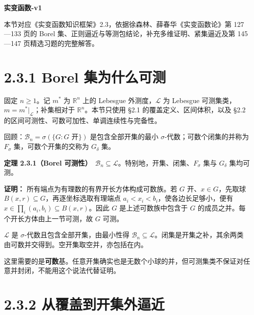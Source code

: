 \documentclass[11pt,a4paper]{article}
\begin{document}
\begin{center}
{\Large\bfseries 实变函数-v1\par}
\vspace{7pt}{\large 2.3 可测集的结构\par}
\vspace{5pt}{第二章 Lebesgue 测度\par}
\end{center}
本节对应《实变函数知识框架》2.3，依据徐森林、薛春华《实变函数论》第 127—133 页的 Borel 集、正则逼近与等测包结论，补充多维证明、紧集逼近及第 145—147 页精选习题的完整解答。
\begingroup\setlength{\parskip}{0pt}\tableofcontents\endgroup

\section[\S{}2.3.1 Borel
集为什么可测]{2.3.1 Borel
集为什么可测}\label{borel-ux96c6ux4e3aux4ec0ux4e48ux53efux6d4b}

固定 \(n\ge1\)。记 \(m^*\) 为 \(\mathbb R^n\) 上的 Lebesgue
外测度，\(\mathcal L\) 为 Lebesgue
可测集类，\(m=m^*|_{\mathcal L}\)；补集相对于
\(\mathbb R^n\)。本节只使用 §2.1 的覆盖定义、区间体积，以及 §2.2
的区间可测性、可数可加性、单调连续性与完备性。

回顾：\(\mathcal B_n=\sigma(\{G:G\text{ 开}\})\) 是包含全部开集的最小
\(\sigma\)-代数；可数个闭集的并称为 \(F_\sigma\) 集，可数个开集的交称为
\(G_\delta\) 集。

\textbf{定理 2.3.1（Borel
可测性）}　\(\mathcal B_n\subseteq\mathcal L\)。特别地，开集、闭集、\(F_\sigma\)
集与 \(G_\delta\) 集均可测。

\textbf{证明：} 所有端点为有理数的有界开长方体构成可数族。若 \(G\)
开、\(x\in G\)，先取球 \(B(x,r)\subseteq G\)，再逐坐标选取有理端点
\(a_i<x_i<b_i\)，使各边长足够小，便有
\(x\in\prod_i(a_i,b_i)\subseteq B(x,r)\)。因此 \(G\)
是上述可数族中包含于 \(G\) 的成员之并。每个开长方体由上一节可测，故
\(G\) 可测。

\(\mathcal L\) 是 \(\sigma\)-代数且包含全部开集，由最小性得
\(\mathcal B_n\subseteq\mathcal L\)。闭集是开集之补，其余两类由可数并交得到。空开集取空并，亦包括在内。

这里需要的是\textbf{可数}基。任意开集确实也是无数个小球的并，但可测集类不保证对任意并封闭，不能用这个说法代替证明。

\section[\S{}2.3.2
从覆盖到开集外逼近]{2.3.2
从覆盖到开集外逼近}\label{ux4eceux8986ux76d6ux5230ux5f00ux96c6ux5916ux903cux8fd1}
\end{document}
